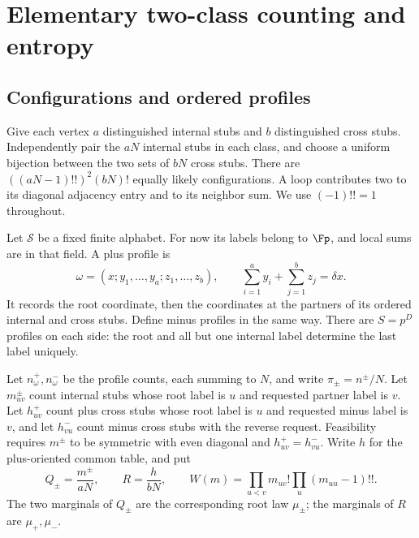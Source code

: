 \section{Elementary two-class counting and entropy}\label{sec:types}

\subsection{Configurations and ordered profiles}
Give each vertex $a$ distinguished internal stubs and $b$ distinguished
cross stubs. Independently pair the $aN$ internal stubs in each class,
and choose a uniform bijection between the two sets of $bN$ cross stubs.
There are $((aN-1)!!)^2(bN)!$ equally likely configurations. A loop
contributes two to its diagonal adjacency entry and to its neighbor sum.
We use $(-1)!!=1$ throughout.

Let $\mathcal S$ be a fixed finite alphabet. For now its labels belong
to $\Fp$, and local sums are in that field. A plus profile is
\begin{equation}\label{eq:plus-profile}
 \omega=(x;y_1,\ldots,y_a;z_1,\ldots,z_b),\qquad
 \sum_{i=1}^a y_i+\sum_{j=1}^b z_j=\delta x.
\end{equation}
It records the root coordinate, then the coordinates at the partners
of its ordered internal and cross stubs. Define minus profiles in the
same way. There are $S=p^D$ profiles on each side: the root and all
but one internal label determine the last label uniquely.

Let $n^+_\omega,n^-_\omega$ be the profile counts, each summing to $N$,
and write $\pi_\pm=n^\pm/N$. Let $m^\pm_{uv}$ count internal stubs
whose root label is $u$ and requested partner label is $v$. Let
$h^+_{uv}$ count plus cross stubs whose root label is $u$ and requested
minus label is $v$, and let $h^-_{vu}$ count minus cross stubs with
the reverse request. Feasibility requires $m^\pm$ to be symmetric
with even diagonal and $h^+_{uv}=h^-_{vu}$. Write $h$ for the
plus-oriented common table, and put
\begin{equation}\label{eq:tables}
 Q_\pm=\frac{m^\pm}{aN},\qquad R=\frac h{bN},\qquad
 W(m)=\prod_{u<v}m_{uv}!\prod_u(m_{uu}-1)!!.
\end{equation}
The two marginals of $Q_\pm$ are the corresponding root law $\mu_\pm$;
the marginals of $R$ are $\mu_+,\mu_-$.

